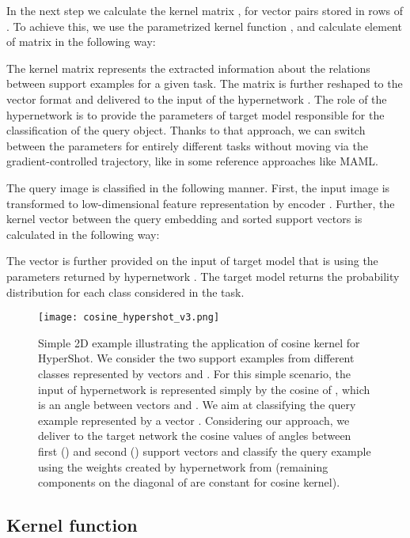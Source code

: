 \documentclass[nohyperref]{article}
\def\our{HyperShot}
\theoremstyle{plain}
\theoremstyle{definition}
\theoremstyle{remark}
\begin{document}
In the next step we calculate the kernel matrix , for vector pairs stored in rows of . To achieve this, we use the parametrized kernel function , and calculate  element of matrix  in the following way:




The kernel matrix  represents the extracted information about the relations between support examples for a given task. The matrix  is further reshaped to the vector format and delivered to the input of the hypernetwork . The role of the hypernetwork is to provide the parameters  of target model  responsible for the classification of the query object. Thanks to that approach, we can switch between the parameters for entirely different tasks without moving via the gradient-controlled trajectory, like in some reference approaches like MAML. 

The query image  is classified in the following manner. First, the input image is transformed to low-dimensional feature representation  by encoder . Further, the kernel vector  between the query embedding and sorted support vectors  is calculated in the following way:



The vector  is further provided on the input of target model  that is using the parameters  returned by hypernetwork . The target model returns the probability distribution  for each class considered in the task. 

\begin{figure}[t]
\begin{center}
    \centerline{\texttt{[image: cosine\_hypershot\_v3.png]}}
    \caption{Simple 2D example illustrating the application of cosine kernel for \our{}. We consider the two support examples from different classes represented by vectors  and . For this simple scenario, the input of hypernetwork is represented simply by the cosine of , which is an angle between vectors  and . We aim at classifying the query example  represented by a vector . Considering our approach, we deliver to the target network  the cosine values of angles between first () and second () support vectors and classify the query example using the weights  created by hypernetwork  from  (remaining components on the diagonal of  are constant for cosine kernel). }
    \label{fig:cosine}
    \end{center}
   \vskip -0.45in
\end{figure}



\subsection{Kernel function}
\end{document}

